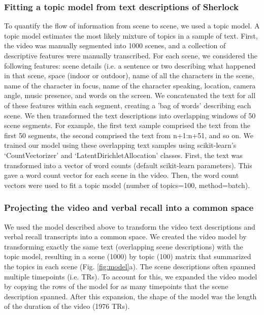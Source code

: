 \documentclass[a4paper,man,natbib,floatsintext]{apa6}
\begin{document}
\subsubsection{Fitting a topic model from text descriptions of Sherlock}
To quantify the flow of information from scene to scene, we used a topic model. A topic model estimates the most likely mixture of topics in a sample of text. First, the video was manually segmented into 1000 scenes, and a collection of descriptive features were manually transcribed.  For each scene, we considered the following features: scene details (i.e. a sentence or two describing what happened in that scene, space (indoor or outdoor), name of all the characters in the scene, name of the character in focus, name of the character speaking, location, camera angle, music presence, and words on the screen. We concatenated the text for all of these features within each segment, creating a 'bag of words' describing each scene. We then transformed the text descriptions into overlapping windows of 50 scene segments. For example, the first text sample comprised the text from the first 50 segments, the second comprised the text from n+1:n+51, and so on. We trained our model using these overlapping text samples using scikit-learn's `CountVectorizer' and `LatentDirichletAllocation' classes.  First, the text was transformed into a vector of word counts (default scikit-learn parameters). This gave a word count vector for each scene in the video.  Then, the word count vectors were used to fit a topic model (number of topics=100, method=batch).

\subsubsection{Projecting the video and verbal recall into a common space}
We used the model described above to transform the video text descriptions and verbal recall transcripts into a common space.  We created the video model by transforming exactly the same text (overlapping scene descriptions) with the topic model, resulting in a scene (1000) by topic (100) matrix that summarized the topics in each scene (Fig. \ref{fig:model}a). The scene descriptions often spanned multiple timepoints (i.e. TRs). To account for this, we expanded the video model by copying the rows of the model for as many timepoints that the scene description spanned. After this expansion, the shape of the model was the length of the duration of the video (1976 TRs).
\end{document}
